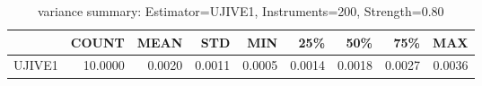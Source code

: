 \begin{table}[ht]
\centering
\caption{variance summary: Estimator=UJIVE1, Instruments=200, Strength=0.80}
\begin{tabular}{lrrrrrrrr}
\toprule
 & COUNT & MEAN & STD & MIN & 25\% & 50\% & 75\% & MAX \\
\midrule
UJIVE1 & 10.0000 & 0.0020 & 0.0011 & 0.0005 & 0.0014 & 0.0018 & 0.0027 & 0.0036 \\
\bottomrule
\end{tabular}
\end{table}
